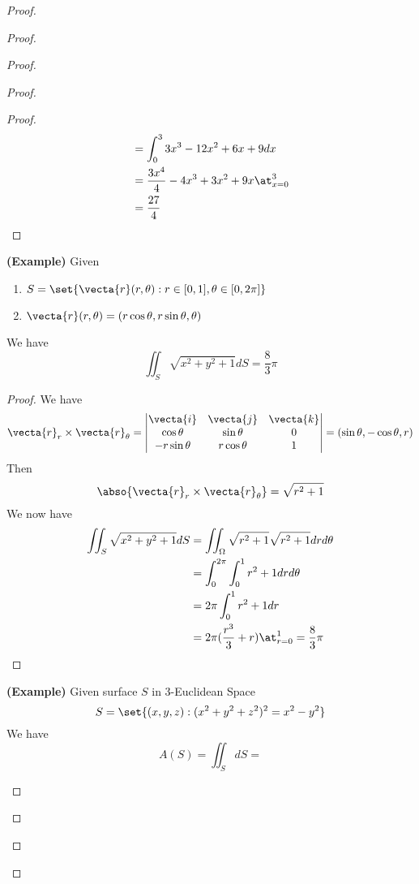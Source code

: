 \documentclass{report}
\begin{document}
\begin{proof}
\begin{proof}
\begin{proof}
\begin{proof}
\begin{proof}
\begin{align*}
&=\int_0^3 3x^3-12x^2+6x+9dx\\
&=\frac{3x^4}{4}-4x^3+3x^2+9x\at_{x=0}^3\\
&=\frac{27}{4}
\end{align*}
\end{proof}
\begin{theorem}
\label{10.1.7}
\textbf{(Example)} Given  
\begin{enumerate}[label=(\alph*)]
  \item $S=\set{\vecta{r}(r,\theta):r\in [0,1],\theta \in [0,2\pi]}$
  \item $\vecta{r}(r,\theta)=(r\cos \theta,r\sin \theta,\theta)$
\end{enumerate}
We have 
\begin{equation*}
\iint_S \sqrt{x^2+y^2+1}dS =\frac{8}{3}\pi
\end{equation*}
\end{theorem}
\begin{proof}
We have 
\begin{equation*}
\vecta{r}_r \times \vecta{r}_\theta= \begin{vmatrix}
  \vecta{i} & \vecta{j} & \vecta{k}\\
  \cos \theta & \sin \theta & 0\\
  -r\sin \theta & r\cos \theta &1 
\end{vmatrix}=(\sin \theta, -\cos \theta, r)
\end{equation*}
Then 
\begin{equation*}
\abso{\vecta{r}_r\times \vecta{r}_\theta}=\sqrt{r^2+1} 
\end{equation*}
We now have 
\begin{align*}
\iint_S \sqrt{x^2+y^2+1} dS&=\iint_{\Omega} \sqrt{r^2+1}\sqrt{r^2+1}  drd\theta \\
&=\int_0^{2\pi}\int_0^1 r^2+1 drd\theta \\
&=2\pi \int_0^1 r^2+1dr\\
&=2\pi (\frac{r^3}{3}+r)\at_{r=0}^1=\frac{8}{3}\pi
\end{align*}
\end{proof}
\begin{theorem}
\label{10.1.8}
\textbf{(Example)} Given surface $S$ in 3-Euclidean Space 
 \begin{equation*}
S=\set{(x,y,z):(x^2+y^2+z^2)^2=x^2-y^2}
\end{equation*}
We have 
\begin{equation*}
A(S)=\iint_S dS=
\end{equation*}
\end{theorem}

\end{proof}
\end{proof}
\end{proof}
\end{proof}
\end{document}
